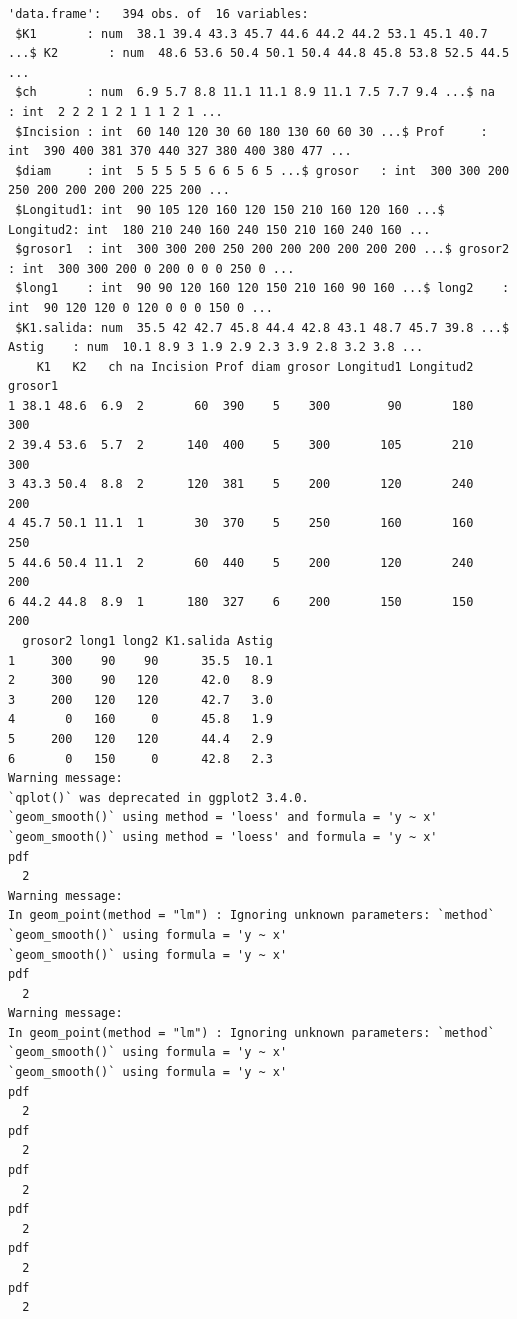 \documentclass[11pt,a4paper]{article}
\begin{document}
\begin{lstlisting}[language={}, basicstyle=\ttfamily\scriptsize, frame=single, breaklines=true]
'data.frame':	394 obs. of  16 variables:
 $K1       : num  38.1 39.4 43.3 45.7 44.6 44.2 44.2 53.1 45.1 40.7 ...$ K2       : num  48.6 53.6 50.4 50.1 50.4 44.8 45.8 53.8 52.5 44.5 ...
 $ch       : num  6.9 5.7 8.8 11.1 11.1 8.9 11.1 7.5 7.7 9.4 ...$ na       : int  2 2 2 1 2 1 1 1 2 1 ...
 $Incision : int  60 140 120 30 60 180 130 60 60 30 ...$ Prof     : int  390 400 381 370 440 327 380 400 380 477 ...
 $diam     : int  5 5 5 5 5 6 6 5 6 5 ...$ grosor   : int  300 300 200 250 200 200 200 200 225 200 ...
 $Longitud1: int  90 105 120 160 120 150 210 160 120 160 ...$ Longitud2: int  180 210 240 160 240 150 210 160 240 160 ...
 $grosor1  : int  300 300 200 250 200 200 200 200 200 200 ...$ grosor2  : int  300 300 200 0 200 0 0 0 250 0 ...
 $long1    : int  90 90 120 160 120 150 210 160 90 160 ...$ long2    : int  90 120 120 0 120 0 0 0 150 0 ...
 $K1.salida: num  35.5 42 42.7 45.8 44.4 42.8 43.1 48.7 45.7 39.8 ...$ Astig    : num  10.1 8.9 3 1.9 2.9 2.3 3.9 2.8 3.2 3.8 ...
    K1   K2   ch na Incision Prof diam grosor Longitud1 Longitud2 grosor1
1 38.1 48.6  6.9  2       60  390    5    300        90       180     300
2 39.4 53.6  5.7  2      140  400    5    300       105       210     300
3 43.3 50.4  8.8  2      120  381    5    200       120       240     200
4 45.7 50.1 11.1  1       30  370    5    250       160       160     250
5 44.6 50.4 11.1  2       60  440    5    200       120       240     200
6 44.2 44.8  8.9  1      180  327    6    200       150       150     200
  grosor2 long1 long2 K1.salida Astig
1     300    90    90      35.5  10.1
2     300    90   120      42.0   8.9
3     200   120   120      42.7   3.0
4       0   160     0      45.8   1.9
5     200   120   120      44.4   2.9
6       0   150     0      42.8   2.3
Warning message:
`qplot()` was deprecated in ggplot2 3.4.0. 
`geom_smooth()` using method = 'loess' and formula = 'y ~ x'
`geom_smooth()` using method = 'loess' and formula = 'y ~ x'
pdf 
  2 
Warning message:
In geom_point(method = "lm") : Ignoring unknown parameters: `method`
`geom_smooth()` using formula = 'y ~ x'
`geom_smooth()` using formula = 'y ~ x'
pdf 
  2 
Warning message:
In geom_point(method = "lm") : Ignoring unknown parameters: `method`
`geom_smooth()` using formula = 'y ~ x'
`geom_smooth()` using formula = 'y ~ x'
pdf 
  2 
pdf 
  2 
pdf 
  2 
pdf 
  2 
pdf 
  2 
pdf 
  2 
\end{lstlisting}
\end{document}
